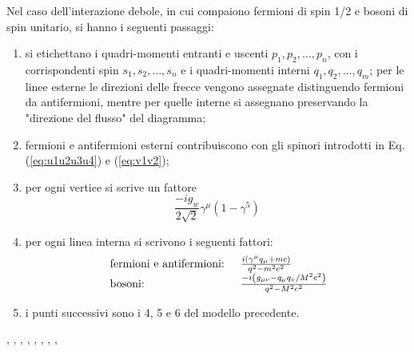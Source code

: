 \documentclass{subnucbo}
\begin{document}
Nel caso dell'interazione debole, in cui compaiono fermioni di spin 1/2 e bosoni di spin unitario, si hanno i seguenti passaggi:
\begin{enumerate}
        \item si etichettano i quadri-momenti entranti e uscenti $p_{1}, p_{2}, \ldots, p_{n}$, con i corrispondenti spin $s_{1}, s_{2}, \ldots, s_{n}$ e i quadri-momenti interni $q_{1}, q_{2}, \ldots, q_{m}$; per le linee esterne le direzioni delle frecce vengono assegnate distinguendo fermioni da antifermioni, mentre per quelle interne si assegnano preservando la "direzione del flusso" del diagramma;
        \item fermioni e antifermioni esterni contribuiscono con gli spinori introdotti in Eq. (\ref{eq:u1u2u3u4}) e (\ref{eq:v1v2});
        \item per ogni vertice si scrive un fattore
                \begin{equation}
                        \frac { - i g _ { w } } { 2 \sqrt { 2 } } \gamma ^ { \mu } \left( 1 - \gamma ^ { 5 } \right)
                \end{equation}
        \item per ogni linea interna si scrivono i seguenti fattori:
                \begin{equation}
                        \begin{array} { l l } { \text { fermioni e antifermioni: } } & { \frac { i \left( \gamma ^ { \mu } q _ { \mu } + m c \right) } { q ^ { 2 } - m ^ { 2 } c ^ { 2 } } } \\ { \text { bosoni: } } & { \frac{- i \left( g _ { \mu \nu } - q _ { \mu } q _ { v } / M ^ { 2 } c ^ { 2 } \right)}{ q ^ { 2 } - M ^ { 2 } c ^ { 2 }  }   }\\ \end{array}
                \end{equation}
        \item i punti successivi sono i 4, 5 e 6 del modello precedente.
\end{enumerate}


\begin{thebibliography}{0}
                ,
                ,
                ,
                ,
                ,
                ,
                ,
                ,
\end{thebibliography}
\end{document}
